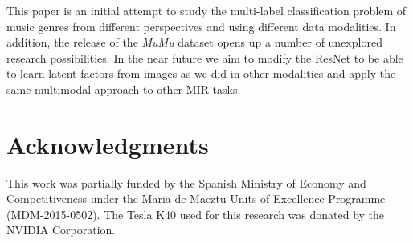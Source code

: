 \documentclass{article}
\begin{document}
This paper is an initial attempt to study the multi-label classification problem of music genres from different perspectives and using different data modalities. In addition, the release of the \emph{MuMu} dataset opens up a number of unexplored research possibilities. In the near future we aim to modify the ResNet to be able to learn latent factors from images as we did in other modalities and apply the same multimodal approach to other MIR tasks. 
\section{Acknowledgments}
This work was partially funded by the Spanish Ministry of Economy and Competitiveness under the Maria de Maeztu Units of Excellence Programme (MDM-2015-0502).
The Tesla K40 used for this research was donated by the NVIDIA Corporation.


\end{document}
